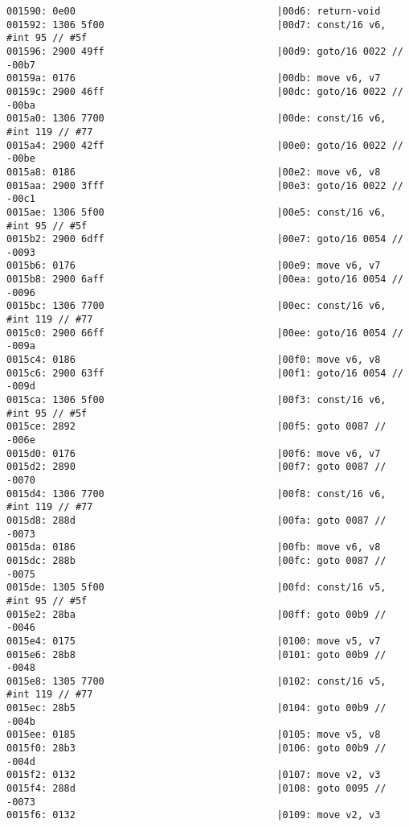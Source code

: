 \begin{lstlisting}
001590: 0e00                                   |00d6: return-void
001592: 1306 5f00                              |00d7: const/16 v6, #int 95 // #5f
001596: 2900 49ff                              |00d9: goto/16 0022 // -00b7
00159a: 0176                                   |00db: move v6, v7
00159c: 2900 46ff                              |00dc: goto/16 0022 // -00ba
0015a0: 1306 7700                              |00de: const/16 v6, #int 119 // #77
0015a4: 2900 42ff                              |00e0: goto/16 0022 // -00be
0015a8: 0186                                   |00e2: move v6, v8
0015aa: 2900 3fff                              |00e3: goto/16 0022 // -00c1
0015ae: 1306 5f00                              |00e5: const/16 v6, #int 95 // #5f
0015b2: 2900 6dff                              |00e7: goto/16 0054 // -0093
0015b6: 0176                                   |00e9: move v6, v7
0015b8: 2900 6aff                              |00ea: goto/16 0054 // -0096
0015bc: 1306 7700                              |00ec: const/16 v6, #int 119 // #77
0015c0: 2900 66ff                              |00ee: goto/16 0054 // -009a
0015c4: 0186                                   |00f0: move v6, v8
0015c6: 2900 63ff                              |00f1: goto/16 0054 // -009d
0015ca: 1306 5f00                              |00f3: const/16 v6, #int 95 // #5f
0015ce: 2892                                   |00f5: goto 0087 // -006e
0015d0: 0176                                   |00f6: move v6, v7
0015d2: 2890                                   |00f7: goto 0087 // -0070
0015d4: 1306 7700                              |00f8: const/16 v6, #int 119 // #77
0015d8: 288d                                   |00fa: goto 0087 // -0073
0015da: 0186                                   |00fb: move v6, v8
0015dc: 288b                                   |00fc: goto 0087 // -0075
0015de: 1305 5f00                              |00fd: const/16 v5, #int 95 // #5f
0015e2: 28ba                                   |00ff: goto 00b9 // -0046
0015e4: 0175                                   |0100: move v5, v7
0015e6: 28b8                                   |0101: goto 00b9 // -0048
0015e8: 1305 7700                              |0102: const/16 v5, #int 119 // #77
0015ec: 28b5                                   |0104: goto 00b9 // -004b
0015ee: 0185                                   |0105: move v5, v8
0015f0: 28b3                                   |0106: goto 00b9 // -004d
0015f2: 0132                                   |0107: move v2, v3
0015f4: 288d                                   |0108: goto 0095 // -0073
0015f6: 0132                                   |0109: move v2, v3

\end{lstlisting}

